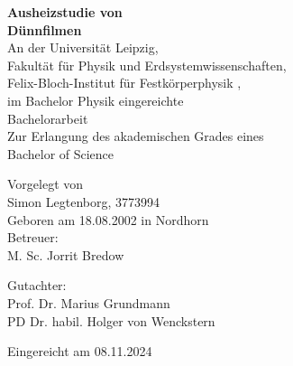 \begin{titlepage}
    \begin{center}
        \vfill
        \Huge
        \textbf{Ausheizstudie von \\
        \heo \vspace{2cm} Dünnfilmen} \\

        \vfill
        \Large
        An der Universität Leipzig, \\
        Fakultät für Physik und Erdsystemwissenschaften, \\
        Felix-Bloch-Institut für Festkörperphysik , \\
        im Bachelor Physik eingereichte \\

        \vfill
        \Huge
        Bachelorarbeit\\

        \vfill
        \Large
        Zur Erlangung des akademischen Grades eines \\
        Bachelor of Science

        \vfill
        Vorgelegt von \\
        Simon Legtenborg, 3773994 \\
        Geboren am 18.08.2002 in Nordhorn \\


        \vfill
        Betreuer: \\
        M. Sc. Jorrit Bredow

        \vfill
        Gutachter: \\
        Prof. Dr. Marius Grundmann \\
        PD Dr. habil. Holger von Wenckstern


        \vfill
        Eingereicht am 08.11.2024
        \vfill


    \end{center}
\end{titlepage}
